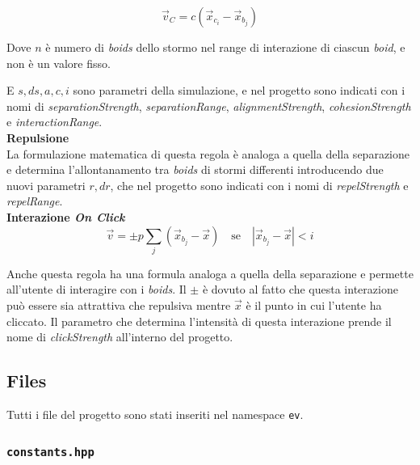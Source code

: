 \documentclass[10pt,a4paper]{article}
\begin{document}
\begin{equation*}
    \vec{v}_C = c (\vec{x}_{c_i} - \vec{x}_{b_j})
\end{equation*}

Dove $n$ è numero di \textit{boids} dello stormo nel range di interazione di ciascun \textit{boid}, e non è un valore fisso.

E $s, ds, a, c, i$ sono parametri della simulazione, e nel progetto sono indicati con i nomi di \textit{separationStrength}, \textit{separationRange}, \textit{alignmentStrength}, \textit{cohesionStrength} e \textit{interactionRange}. \\

\textbf{Repulsione} \\

La formulazione matematica di questa regola è analoga a quella della separazione e determina l'allontanamento tra \textit{boids} di stormi differenti introducendo due nuovi parametri $r, dr$, che nel progetto sono indicati con i nomi di \textit{repelStrength} e \textit{repelRange}. \\

\textbf{Interazione \textit{On Click}} \\

\begin{equation*}
    \vec{v} = \pm p \sum_{j} (\vec{x}_{b_j} - \vec{x}) \quad \text{se} \quad \left| \vec{x}_{b_j} - \vec{x} \right| < i
\end{equation*}

Anche questa regola ha una formula analoga a quella della separazione e permette all'utente di interagire con i \textit{boids}. Il $\pm$ è dovuto al fatto che questa interazione può essere sia attrattiva che repulsiva mentre $\vec{x}$ è il punto in cui l'utente ha cliccato. Il parametro che determina l'intensità di questa interazione prende il nome di \textit{clickStrength} all'interno del progetto.

\newpage

\subsection{Files}

Tutti i file del progetto sono stati inseriti nel namespace \texttt{ev}.

\subsubsection{\texttt{constants.hpp}}
\end{document}
